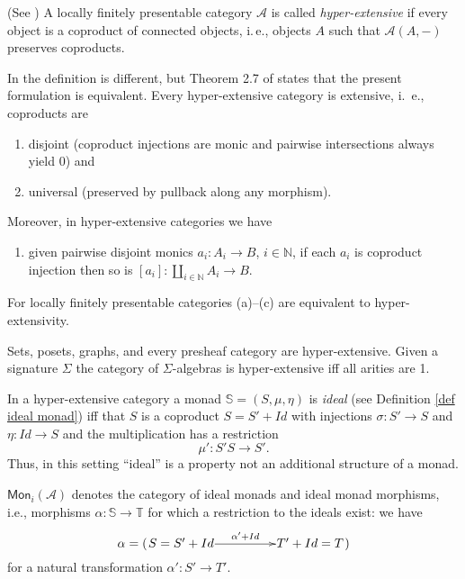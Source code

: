 \documentclass{LMCS}
\theoremstyle{plain}
\theoremstyle{definition}
\numberwithin{equation}{section}
\begin{document}
\begin{defi}(See \cite{abmv_how})
A locally finitely presentable category $\mathcal A$ is called {\it hyper-extensive} if every object is a coproduct of connected objects, i.\,e., objects $A$ such that $\mathcal A(A,-)$ preserves coproducts.
\end{defi}

\begin{rem}
In \cite{abmv_how} the definition is different, but Theorem 2.7 of \cite{abmv_how} states that the present formulation is equivalent. Every hyper-extensive category is extensive, i.~e., coproducts are
\begin{enumerate}[label=\({\alph*}]
\item disjoint (coproduct injections are monic and pairwise intersections always yield $0$)
and

\item universal (preserved by pullback along any morphism).
\end{enumerate}
Moreover, in hyper-extensive categories we have
\begin{enumerate}[label=\({\alph*},resume]
\item given pairwise disjoint monics $a_i:A_i\rightarrow B$, $i\in  \mathbb N$, if each $a_i$ is coproduct injection then so is $[a_i]:\coprod_{i\in \mathbb N}A_i\rightarrow B$.
\end{enumerate}
For locally finitely presentable categories (a)--(c) are equivalent to hyper-extensivity.
\end{rem}

\begin{exa}
Sets, posets, graphs, and every presheaf category are hyper-extensive. Given a signature $\Sigma$ the category of $\Sigma$-algebras is hyper-extensive iff all arities are 1.
\end{exa}

\begin{rem}
In a hyper-extensive category a monad $\mathbb S=(S,\mu, \eta)$ is
{\it ideal} (see Definition \ref{def ideal monad}) iff that $S$
is a coproduct $S=S'+Id$ with injections $\sigma:S'\rightarrow S$ and
$\eta:Id\rightarrow S$ and the multiplication has a
restriction $$\mu':S'S\rightarrow S'.$$
Thus, in this setting ``ideal'' is a property not an additional structure of a monad. 
\end{rem}

\begin{nota}
$\mathsf{Mon}_i(\mathcal A)$ denotes the category of ideal monads and ideal monad morphisms, i.e., morphisms $\alpha:\mathbb S\rightarrow \mathbb T$ for which a restriction to the ideals exist: we have 
\[
\alpha=(\xymatrix@1@C+2pc{
  S = S' +Id 
  \ar[r]^-{\alpha' + Id}
  & T' + Id = T
})
\]
for a natural transformation $\alpha':S'\rightarrow T'$.
\end{nota}
\end{document}
